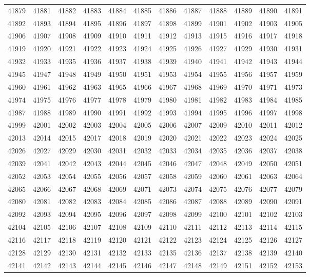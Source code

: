 \begin{center}
\begin{longtable}{llllllllllll}
41879 &41881 &41882 &41883 &41884 &41885 &41886 &41887 &41888 &41889 &41890 &41891 \\
41892 &41893 &41894 &41895 &41896 &41897 &41898 &41899 &41901 &41902 &41903 &41905 \\
41906 &41907 &41908 &41909 &41910 &41911 &41912 &41913 &41915 &41916 &41917 &41918 \\
41919 &41920 &41921 &41922 &41923 &41924 &41925 &41926 &41927 &41929 &41930 &41931 \\
41932 &41933 &41935 &41936 &41937 &41938 &41939 &41940 &41941 &41942 &41943 &41944 \\
41945 &41947 &41948 &41949 &41950 &41951 &41953 &41954 &41955 &41956 &41957 &41959 \\
41960 &41961 &41962 &41963 &41965 &41966 &41967 &41968 &41969 &41970 &41971 &41973 \\
41974 &41975 &41976 &41977 &41978 &41979 &41980 &41981 &41982 &41983 &41984 &41985 \\
41987 &41988 &41989 &41990 &41991 &41992 &41993 &41994 &41995 &41996 &41997 &41998 \\
41999 &42001 &42002 &42003 &42004 &42005 &42006 &42007 &42009 &42010 &42011 &42012 \\
42013 &42014 &42015 &42017 &42018 &42019 &42020 &42021 &42022 &42023 &42024 &42025 \\
42026 &42027 &42029 &42030 &42031 &42032 &42033 &42034 &42035 &42036 &42037 &42038 \\
42039 &42041 &42042 &42043 &42044 &42045 &42046 &42047 &42048 &42049 &42050 &42051 \\
42052 &42053 &42054 &42055 &42056 &42057 &42058 &42059 &42060 &42061 &42063 &42064 \\
42065 &42066 &42067 &42068 &42069 &42071 &42073 &42074 &42075 &42076 &42077 &42079 \\
42080 &42081 &42082 &42083 &42084 &42085 &42086 &42087 &42088 &42089 &42090 &42091 \\
42092 &42093 &42094 &42095 &42096 &42097 &42098 &42099 &42100 &42101 &42102 &42103 \\
42104 &42105 &42106 &42107 &42108 &42109 &42110 &42111 &42112 &42113 &42114 &42115 \\
42116 &42117 &42118 &42119 &42120 &42121 &42122 &42123 &42124 &42125 &42126 &42127 \\
42128 &42129 &42130 &42131 &42132 &42133 &42135 &42136 &42137 &42138 &42139 &42140 \\
42141 &42142 &42143 &42144 &42145 &42146 &42147 &42148 &42149 &42151 &42152 &42153 \\

\end{longtable}
\end{center}
